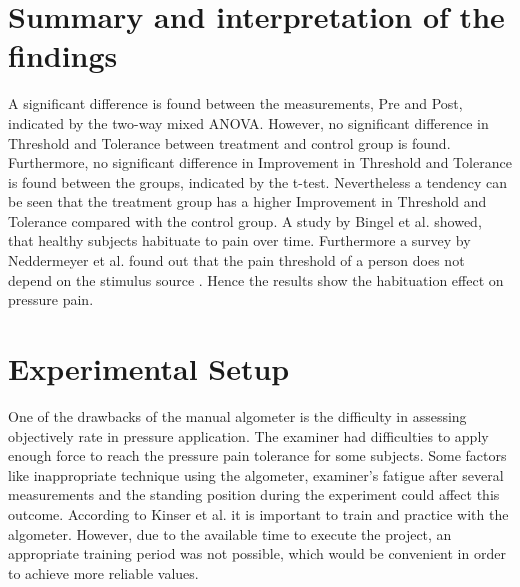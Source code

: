 \section{Summary and interpretation of the findings}


A significant difference is found between the measurements, Pre and Post, indicated by the two-way mixed ANOVA. However, no significant
difference in Threshold and Tolerance between treatment and control group is found. Furthermore, no significant difference in Improvement in Threshold and Tolerance is found between the groups, indicated by the t-test. Nevertheless a tendency can be seen that the treatment group has a higher Improvement in Threshold and Tolerance compared with the control group. A study by Bingel et al. \cite{Bingel2007} showed, that healthy subjects habituate to pain over time.  Furthermore a survey by Neddermeyer et al. \cite{Neddermeyer2007} found out that the pain threshold of a person does not depend on the stimulus source . Hence the results show the habituation effect on pressure pain.

\section{Experimental Setup}
One of the drawbacks of the manual algometer is the difficulty in assessing objectively rate in pressure application. The examiner had difficulties to apply enough force to reach the pressure pain tolerance for some subjects. Some factors like inappropriate technique using the algometer, examiner's fatigue after several measurements and the standing position during the experiment could affect this outcome.  According to Kinser et al. \cite{Kinser2009} it is important to train and practice with the algometer. However, due to the available time to execute the project, an appropriate training period was not possible, which would be convenient in order to achieve  more reliable values.

